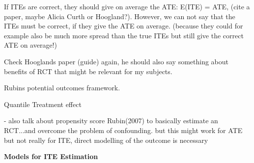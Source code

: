 % 
% 
% 
% 

If ITEs are correct, they should give on average the ATE: E(ITE) = ATE, (cite a paper, maybe Alicia Curth or Hoogland?). However, we can not say that the ITEs must be correct, if they give the ATE on average. (because they could for example also be much more spread than the true ITEs but still give the correct ATE on average!)


Check Hooglands paper (guide) again, he should also say something about benefits of RCT that might be relevant for my subjects.


Rubins potential outcomes framework.

Quantile Treatment effect




- also talk about propensity score Rubin(2007) to basically estimate an RCT...and overcome the problem of confounding. but this might work for ATE but not really for ITE, direct modelling of the outcome is necessary %


\textbf{Models for ITE Estimation} \label{sec:ite_models}




